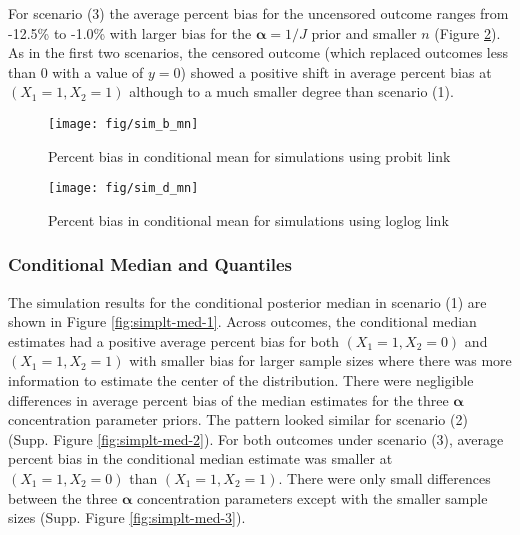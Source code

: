 \documentclass[
]{article}
\begin{document}
For scenario (3) the average percent bias for the uncensored outcome ranges from -12.5\% to -1.0\% with larger bias for the \(\boldsymbol{\alpha}=1/J\) prior and smaller \(n\) (Figure \ref{fig:simplt-mn-3}). As in the first two scenarios, the censored outcome (which replaced outcomes less than 0 with a value of \(y=0\)) showed a positive shift in average percent bias at \((X_1=1,X_2=1)\) although to a much smaller degree than scenario (1).

\begin{figure}

{\centering \texttt{[image: fig/sim\_b\_mn]} 

}

\caption{Percent bias in conditional mean for simulations using probit link}\label{fig:simplt-mn-1}
\end{figure}

\begin{figure}

{\centering \texttt{[image: fig/sim\_d\_mn]} 

}

\caption{Percent bias in conditional mean for simulations using loglog link}\label{fig:simplt-mn-3}
\end{figure}

\hypertarget{conditional-median-and-quantiles}{%
\subsubsection{Conditional Median and Quantiles}\label{conditional-median-and-quantiles}}

The simulation results for the conditional posterior median in scenario (1) are shown in Figure \ref{fig:simplt-med-1}. Across outcomes, the conditional median estimates had a positive average percent bias for both \((X_1=1,X_2=0)\) and \((X_1=1,X_2=1)\) with smaller bias for larger sample sizes where there was more information to estimate the center of the distribution. There were negligible differences in average percent bias of the median estimates for the three \(\boldsymbol{\alpha}\) concentration parameter priors. The pattern looked similar for scenario (2) (Supp. Figure \ref{fig:simplt-med-2}). For both outcomes under scenario (3), average percent bias in the conditional median estimate was smaller at \((X_1=1,X_2=0)\) than \((X_1=1,X_2=1)\). There were only small differences between the three \(\boldsymbol{\alpha}\) concentration parameters except with the smaller sample sizes (Supp. Figure \ref{fig:simplt-med-3}).
\end{document}
